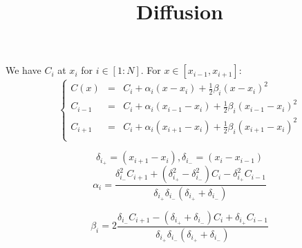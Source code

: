 \documentclass[aps,11pt]{revtex4}
\begin{document}
\title{Diffusion}
\maketitle

We have $C_{i}$ at $x_i$ for $i\in[1:N]$.
For $x\in[x_{i-1},x_{i+1}]$:
\begin{equation}
\left\lbrace
\begin{array}{rcl}
	C(x)    & = & C_i + \alpha_i (x-x_i) + \frac{1}{2}\beta_i (x-x_i)^2\\
	C_{i-1} & = & C_i + \alpha_i (x_{i-1}-x_{i} ) + \frac{1}{2}\beta_i (x_{i-1}-x_i)^2\\
    C_{i+1} & = & C_i + \alpha_i (x_{i+1}-x_{i} ) + \frac{1}{2}\beta_i (x_{i+1}-x_i)^2\\
\end{array}
\right.
\end{equation}

$$
	\delta_{i_+} = (x_{i+1}-x_{i} ), \delta_{i_-} = (x_{i}-x_{i-1} ) 
$$
\begin{equation}
	\alpha_i = \dfrac{ \delta_{i_-}^2 C_{i+1}  +(\delta_{i_+}^2-\delta_{i_-}^2)C_i - \delta_{i_+}^2 C_{i-1} }{ \delta_{i_+}\delta_{i_-}(\delta_{i_+}+\delta_{i_-})  }
\end{equation}

\begin{equation}
	\beta_i = 2\dfrac{ \delta_{i_-} C_{i+1}  - (\delta_{i_+}+\delta_{i_-})C_i + \delta_{i_+} C_{i-1} }{ \delta_{i_+}\delta_{i_-}(\delta_{i_+}+\delta_{i_-})  }
\end{equation}
\end{document}
